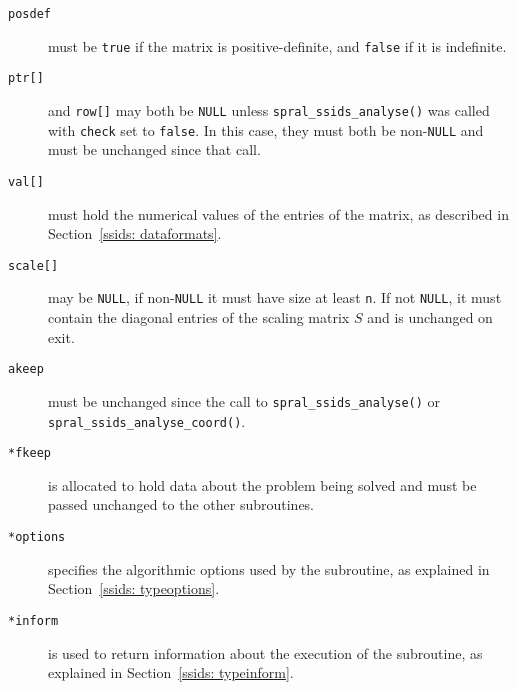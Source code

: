 \begin{description}
\item[\texttt{posdef}] must be {\tt true} if the matrix is positive-definite,
   and {\tt false} if it is indefinite.

\item[\texttt{ptr[]}] and {\tt row[]} may both be \texttt{NULL} unless 
   {\tt spral\_ssids\_analyse()} was called with {\tt check} set to {\tt false}.
   In this case, they must both be non-\texttt{NULL} and must be unchanged
   since that call.

\item[\texttt{val[]}] must hold the numerical values of the entries of the
   matrix, as described in Section~\ref{ssids: dataformats}.

\item[\texttt{scale[]}] may be \texttt{NULL}, if non-\texttt{NULL} it must have
   size at least {\tt n}. If not \texttt{NULL}, it must contain the diagonal
   entries of the scaling matrix ${S}$ and is unchanged on exit.

\item[\texttt{akeep}] must be unchanged since the call to
   {\tt spral\_ssids\_analyse()} or {\tt spral\_ssids\_analyse\_coord()}.

\item[\texttt{*fkeep}] is allocated to hold data about the problem being
   solved and must be passed unchanged to the other subroutines.

\item[\texttt{*options}] specifies the algorithmic options used by the
   subroutine, as explained in Section~\ref{ssids: typeoptions}.

\item[\texttt{*inform}] is used to return information about the execution
   of the subroutine, as explained in Section~\ref{ssids: typeinform}.

\end{description}

